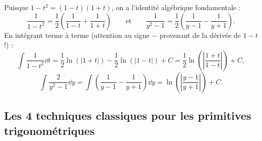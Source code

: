 \begin{theoreme}
Puisque $1 - t^2 = (1 - t)(1 + t)$, on a l'identité algébrique fondamentale :
\[
    \boxed{\frac{1}{1 - t^2} = \frac{1}{2}\left(\frac{1}{1 - t} + \frac{1}{1 + t}\right)} \qquad \text{et} \qquad \boxed{\frac{1}{y^2 - 1} = \frac{1}{2}\left(\frac{1}{y - 1} - \frac{1}{y + 1}\right)}.
\]
En intégrant terme à terme (attention au signe $-$ provenant de la dérivée de $1 - t$ !) :
\[
    \boxed{\int \frac{1}{1 - t^2}\dd t = \frac{1}{2}\ln(|1+t|) - \frac{1}{2}\ln(|1-t|) + C = \frac{1}{2}\ln\left(\left|\frac{1 + t}{1 - t}\right|\right) + C},
\]
\[
    \boxed{\int \frac{2}{y^2 - 1}\dd y = \int \left(\frac{1}{y-1} - \frac{1}{y+1}\right)\dd y = \ln\left(\left|\frac{y - 1}{y + 1}\right|\right) + C}.
\]
\end{theoreme}

\subsection{Les 4 techniques classiques pour les primitives trigonométriques}


